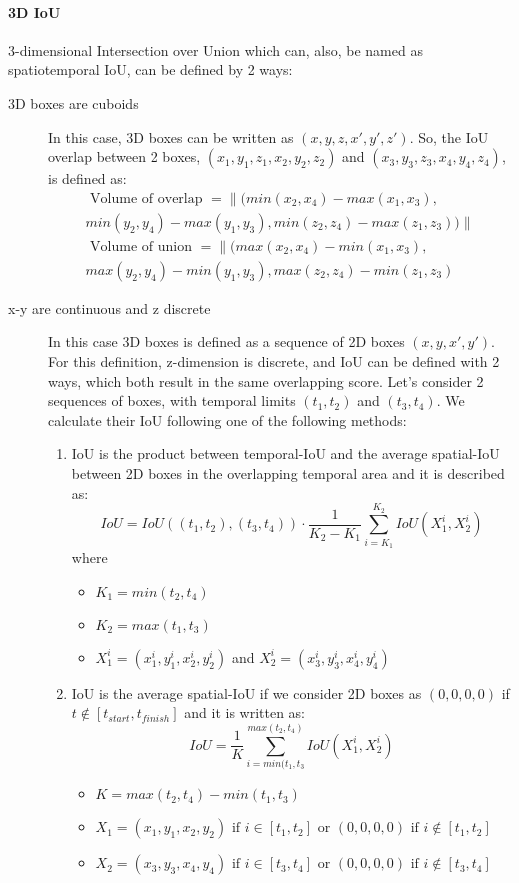 \paragraph{3D IoU} 3-dimensional Intersection over Union which can, also, be named as spatiotemporal IoU, can be defined by 2 ways:
\begin{description}
\item[3D boxes are cuboids] In this case, 3D boxes can be written  as $(x,y,z,x',y',z')$.
So, the IoU overlap between 2 boxes, $(x_1,y_1,z_1,x_2,y_2,z_2)$
  and $(x_3,y_3,z_3,x_4,y_4,z_4)$, is defined as:
\begin{equation*} 
\begin{split}
  \text { Volume of overlap } = \lVert(min(x_2,x_4) - max(x_1,x_3), \\
  min(y_2,y_4) -  max(y_1,y_3), min(z_2,z_4) -  max(z_1,z_3) ) \rVert  \\
\text { Volume of union } = \lVert(max(x_2,x_4) - min(x_1,x_3), \\
 max(y_2,y_4) - min(y_1,y_3), max(z_2,z_4) - min(z_1,z_3)
\end{split}
\end{equation*}

\item[x-y are continuous and z discrete] In this case 3D boxes is defined as a sequence of 2D boxes $(x,y,x',y')$. For this definition, z-dimension is
  discrete, and IoU can be defined with 2 ways, which both result in the same overlapping score. Let's consider 2 sequences of boxes, with temporal limits
  $(t_1,t_2)$ and $(t_3,t_4)$. We calculate their IoU following one of the following methods:
  \begin{enumerate}
\item IoU is the product between temporal-IoU and the average spatial-IoU between 2D boxes in the overlapping temporal area and it is described as:
\[ IoU =  IoU((t_1,t_2),(t_3,t_4)) \cdot \frac{1}{K_2-K_1} \sum_{i=K_1}^{K_2} IoU(X_1^i, X_2^i) \]
  where \begin{itemize}
  \item$K_1 = min(t_2,t_4)$
  \item$K_2 = max(t_1,t_3)$
  \item$ X_1^i =  (x_1^i,y_1^i,x_2^i,y_2^i)$ and $X_2^i =  (x_3^i,y_3^i,x_4^i,y_4^i) $
  \end{itemize}
\item IoU is the average spatial-IoU if we consider 2D boxes as $(0,0,0,0)$ if $ t \notin [t_{start},t_{finish}]$ and it is written as:
  \[ IoU = \frac{1}{K} \sum_{i = min(t_1,t_3}^{max(t_2,t_4)} IoU(X_1^i,X_2^i) \]
  \begin{itemize}
  \item $K = max(t_2,t_4) - min(t_1,t_3)$
  \item $ X_1 = (x_1,y_1,x_2,y_2)  \text{ if } i \in [t_1,t_2] \text{ or }
        (0,0,0,0)  \text{ if } i \notin [t_1,t_2]  $
  \item $ X_2 = (x_3,y_3,x_4,y_4)  \text{ if } i \in [t_3,t_4] \text{ or }
        (0,0,0,0)  \text{ if } i \notin [t_3,t_4]  $
    \end{itemize}
  

\end{enumerate}
\end{description}
